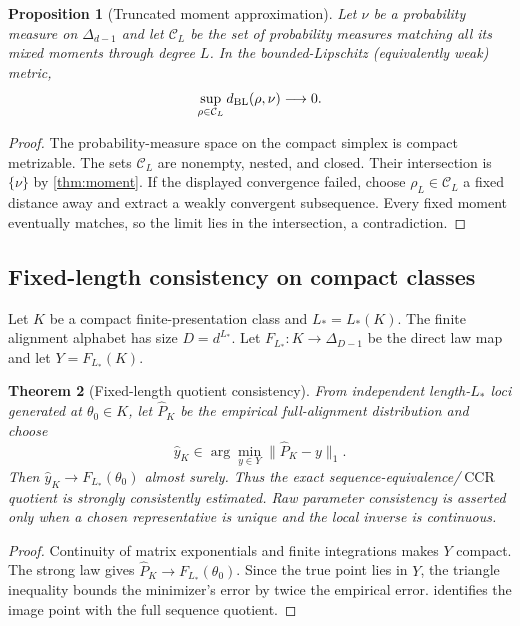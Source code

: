 \documentclass[11pt]{article}
\newtheorem{theorem}{Theorem}[section]
\newtheorem{proposition}[theorem]{Proposition}
\newcommand{\CCR}{\operatorname{CCR}}
\newcommand{\cC}{\mathcal C}
\begin{document}
\begin{proposition}[Truncated moment approximation]
\label{prop:moment-approx}
Let $\nu$ be a probability measure on $\Delta_{d-1}$ and let $\cC_L$ be the set of probability measures matching all its mixed moments through degree $L$.  In the bounded-Lipschitz (equivalently weak) metric,
\[
\sup_{\rho\in\cC_L}d_{\rm BL}(\rho,\nu)\longrightarrow0.
\]
\end{proposition}

\begin{proof}
The probability-measure space on the compact simplex is compact metrizable.  The sets $\cC_L$ are nonempty, nested, and closed.  Their intersection is $\{\nu\}$ by \cref{thm:moment}.  If the displayed convergence failed, choose $\rho_L\in\cC_L$ a fixed distance away and extract a weakly convergent subsequence.  Every fixed moment eventually matches, so the limit lies in the intersection, a contradiction.
\end{proof}

\subsection{Fixed-length consistency on compact classes}

Let $K$ be a compact finite-presentation class and $L_*=L_*(K)$.  The finite alignment alphabet has size $D=d^{L_*}$.  Let $F_{L_*}:K\to\Delta_{D-1}$ be the direct law map and let $Y=F_{L_*}(K)$.

\begin{theorem}[Fixed-length quotient consistency]
\label{thm:fixed-consistency}
From independent length-$L_*$ loci generated at $\theta_0\in K$, let $\widehat P_K$ be the empirical full-alignment distribution and choose
\[
\widehat y_K\in\arg\min_{y\in Y}\|\widehat P_K-y\|_1.
\]
Then $\widehat y_K\to F_{L_*}(\theta_0)$ almost surely.  Thus the exact sequence-equivalence/$\CCR$ quotient is strongly consistently estimated.  Raw parameter consistency is asserted only when a chosen representative is unique and the local inverse is continuous.
\end{theorem}

\begin{proof}
Continuity of matrix exponentials and finite integrations makes $Y$ compact.  The strong law gives $\widehat P_K\to F_{L_*}(\theta_0)$.  Since the true point lies in $Y$, the triangle inequality bounds the minimizer's error by twice the empirical error.   identifies the image point with the full sequence quotient.
\end{proof}
\end{document}
